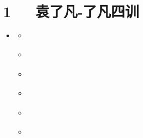 \documentclass[letterpaper,10pt,english]{sphinxmanual}
\begin{document}
\chapter{1   袁了凡-了凡四训}
\label{\detokenize{p00_u5176_u5b83/_u8881_u4e86_u51e1-_u4e86_u51e1_u56db_u8bad:id1}}\label{\detokenize{p00_u5176_u5b83/_u8881_u4e86_u51e1-_u4e86_u51e1_u56db_u8bad::doc}}
\begin{sphinxShadowBox}
\begin{itemize}
\item {} 
\label{\detokenize{p00_u5176_u5b83/_u8881_u4e86_u51e1-_u4e86_u51e1_u56db_u8bad:id9}}{\hyperref[\detokenize{p00_u5176_u5b83/_u8881_u4e86_u51e1-_u4e86_u51e1_u56db_u8bad:id1}]{}}
\begin{itemize}
\item {} 
\label{\detokenize{p00_u5176_u5b83/_u8881_u4e86_u51e1-_u4e86_u51e1_u56db_u8bad:id10}}{\hyperref[\detokenize{p00_u5176_u5b83/_u8881_u4e86_u51e1-_u4e86_u51e1_u56db_u8bad:id3}]{}}

\item {} 
\label{\detokenize{p00_u5176_u5b83/_u8881_u4e86_u51e1-_u4e86_u51e1_u56db_u8bad:id11}}{\hyperref[\detokenize{p00_u5176_u5b83/_u8881_u4e86_u51e1-_u4e86_u51e1_u56db_u8bad:id4}]{}}

\item {} 
\label{\detokenize{p00_u5176_u5b83/_u8881_u4e86_u51e1-_u4e86_u51e1_u56db_u8bad:id12}}{\hyperref[\detokenize{p00_u5176_u5b83/_u8881_u4e86_u51e1-_u4e86_u51e1_u56db_u8bad:id5}]{}}

\item {} 
\label{\detokenize{p00_u5176_u5b83/_u8881_u4e86_u51e1-_u4e86_u51e1_u56db_u8bad:id13}}{\hyperref[\detokenize{p00_u5176_u5b83/_u8881_u4e86_u51e1-_u4e86_u51e1_u56db_u8bad:id6}]{}}

\item {} 
\label{\detokenize{p00_u5176_u5b83/_u8881_u4e86_u51e1-_u4e86_u51e1_u56db_u8bad:id14}}{\hyperref[\detokenize{p00_u5176_u5b83/_u8881_u4e86_u51e1-_u4e86_u51e1_u56db_u8bad:id7}]{}}

\item {} 
\label{\detokenize{p00_u5176_u5b83/_u8881_u4e86_u51e1-_u4e86_u51e1_u56db_u8bad:id15}}{\hyperref[\detokenize{p00_u5176_u5b83/_u8881_u4e86_u51e1-_u4e86_u51e1_u56db_u8bad:id8}]{}}

\end{itemize}

\end{itemize}
\end{sphinxShadowBox}
\end{document}
